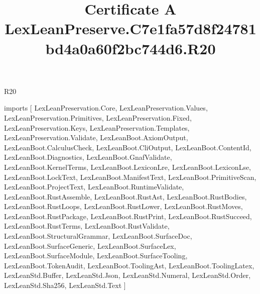 \begin{lexlean}{R20}
\title{Certificate A LexLeanPreserve.C7e1fa57d8f24781bd4a0a60f2bc744d6.R20}
\begin{coremodule}
imports [
  LexLeanPreservation.Core,
  LexLeanPreservation.Values,
  LexLeanPreservation.Primitives,
  LexLeanPreservation.Fixed,
  LexLeanPreservation.Keys,
  LexLeanPreservation.Templates,
  LexLeanPreservation.Validate,
  LexLeanBoot.AxiomOutput,
  LexLeanBoot.CalculusCheck,
  LexLeanBoot.CliOutput,
  LexLeanBoot.ContentId,
  LexLeanBoot.Diagnostics,
  LexLeanBoot.GnafValidate,
  LexLeanBoot.KernelTerms,
  LexLeanBoot.LexiconLre,
  LexLeanBoot.LexiconLse,
  LexLeanBoot.LockText,
  LexLeanBoot.ManifestText,
  LexLeanBoot.PrimitiveScan,
  LexLeanBoot.ProjectText,
  LexLeanBoot.RuntimeValidate,
  LexLeanBoot.RustAssemble,
  LexLeanBoot.RustAst,
  LexLeanBoot.RustBodies,
  LexLeanBoot.RustLoops,
  LexLeanBoot.RustLower,
  LexLeanBoot.RustMoves,
  LexLeanBoot.RustPackage,
  LexLeanBoot.RustPrint,
  LexLeanBoot.RustSucceed,
  LexLeanBoot.RustTerms,
  LexLeanBoot.RustValidate,
  LexLeanBoot.StructuralGrammar,
  LexLeanBoot.SurfaceDoc,
  LexLeanBoot.SurfaceGeneric,
  LexLeanBoot.SurfaceLex,
  LexLeanBoot.SurfaceModule,
  LexLeanBoot.SurfaceTooling,
  LexLeanBoot.TokenAudit,
  LexLeanBoot.ToolingAst,
  LexLeanBoot.ToolingLatex,
  LexLeanStd.Buffer,
  LexLeanStd.Json,
  LexLeanStd.Numeral,
  LexLeanStd.Order,
  LexLeanStd.Sha256,
  LexLeanStd.Text
]


\end{coremodule}
\end{lexlean}
